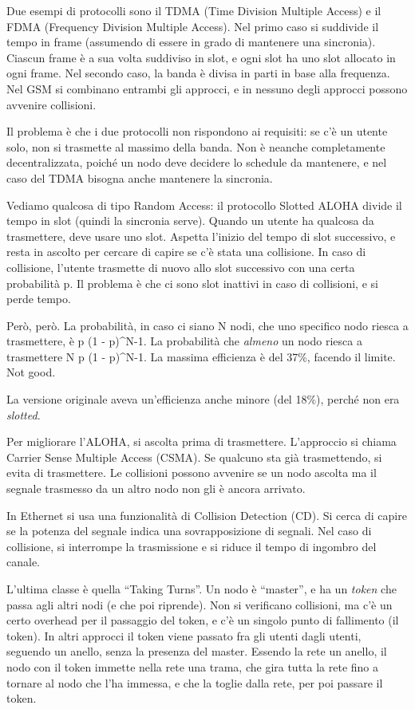 Due esempi di protocolli sono il TDMA (Time Division Multiple Access) e il FDMA (Frequency Division Multiple Access). Nel primo caso si suddivide il tempo in frame (assumendo di essere in grado di mantenere una sincronia). Ciascun frame \`e a sua volta suddiviso in slot, e ogni slot ha uno slot allocato in ogni frame. Nel secondo caso, la banda \`e divisa in parti in base alla frequenza. Nel GSM si combinano entrambi gli approcci, e in nessuno degli approcci possono avvenire collisioni.

Il problema \`e che i due protocolli non rispondono ai requisiti: se c'\`e un utente solo, non si trasmette al massimo della banda. Non \`e neanche completamente decentralizzata, poich\'e un nodo deve decidere lo schedule da mantenere, e nel caso del TDMA bisogna anche mantenere la sincronia.

Vediamo qualcosa di tipo Random Access: il protocollo Slotted ALOHA divide il tempo in slot (quindi la sincronia serve). Quando un utente ha qualcosa da trasmettere, deve usare uno slot. Aspetta l'inizio del tempo di slot successivo, e resta in ascolto per cercare di capire se c'\`e stata una collisione. In caso di collisione, l'utente trasmette di nuovo allo slot successivo con una certa probabilit\`a p. Il problema \`e che ci sono slot inattivi in caso di collisioni, e si perde tempo.

Per\`o, per\`o. La probabilit\`a, in caso ci siano N nodi, che uno specifico nodo riesca a trasmettere, \`e p \cdot (1 - p)^{N-1}. La probabilit\`a che \emph{almeno} un nodo riesca a trasmettere \e N \cdot p \cdot (1 - p)^{N-1}. La massima efficienza \`e del 37\%, facendo il limite. Not good.

La versione originale aveva un'efficienza anche minore (del 18\%), perch\'e non era \emph{slotted}.

Per migliorare l'ALOHA, si ascolta prima di trasmettere. L'approccio si chiama Carrier Sense Multiple Access (CSMA). Se qualcuno sta gi\`a trasmettendo, si evita di trasmettere. Le collisioni possono avvenire se un nodo ascolta ma il segnale trasmesso da un altro nodo non gli \`e ancora arrivato.

In Ethernet si usa una funzionalit\`a di Collision Detection (CD). Si cerca di capire se la potenza del segnale indica una sovrapposizione di segnali. Nel caso di collisione, si interrompe la trasmissione e si riduce il tempo di ingombro del canale.

L'ultima classe \`e quella ``Taking Turns''. Un nodo \`e ``master'', e ha un \emph{token} che passa agli altri nodi (e che poi riprende). Non si verificano collisioni, ma c'\`e un certo overhead per il passaggio del token, e c'\`e un singolo punto di fallimento (il token). In altri approcci il token viene passato fra gli utenti dagli utenti, seguendo un anello, senza la presenza del master. Essendo la rete un anello, il nodo con il token immette nella rete una trama, che gira tutta la rete fino a tornare al nodo che l'ha immessa, e che la toglie dalla rete, per poi passare il token.

